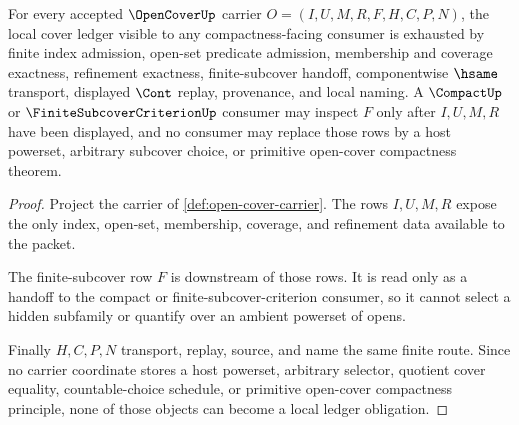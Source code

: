 \begin{theorem}
\label{thm:open-cover-finite-ledger-obligation}
For every accepted $\OpenCoverUp$ carrier $O=(I,U,M,R,F,H,C,P,N)$, the local cover ledger visible to any compactness-facing consumer is exhausted by finite index admission, open-set predicate admission, membership and coverage exactness, refinement exactness, finite-subcover handoff, componentwise $\hsame$ transport, displayed $\Cont$ replay, provenance, and local naming. A $\CompactUp$ or $\FiniteSubcoverCriterionUp$ consumer may inspect $F$ only after $I,U,M,R$ have been displayed, and no consumer may replace those rows by a host powerset, arbitrary subcover choice, or primitive open-cover compactness theorem.
\end{theorem}
\begin{proof}
Project the carrier of \autoref{def:open-cover-carrier}. The rows $I,U,M,R$ expose the only index, open-set, membership, coverage, and refinement data available to the packet.

The finite-subcover row $F$ is downstream of those rows. It is read only as a handoff to the compact or finite-subcover-criterion consumer, so it cannot select a hidden subfamily or quantify over an ambient powerset of opens.

Finally $H,C,P,N$ transport, replay, source, and name the same finite route. Since no carrier coordinate stores a host powerset, arbitrary selector, quotient cover equality, countable-choice schedule, or primitive open-cover compactness principle, none of those objects can become a local ledger obligation.
\end{proof}


